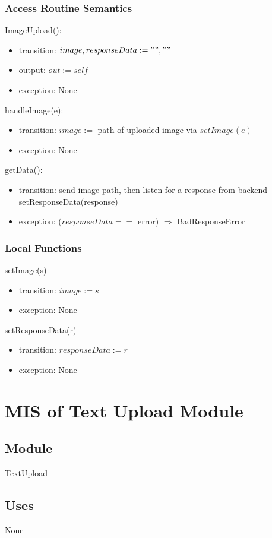 \documentclass[12pt, titlepage]{article}
\begin{document}
\subsubsection{Access Routine Semantics}
ImageUpload():
\begin{itemize}
	\item transition: $image, responseData := "", ""$
	\item output: $out := self$
	\item exception: None
\end{itemize}
\noindent
handleImage(e):
\begin{itemize}
	\item transition: $image :=$ path of uploaded image via $setImage(e)$
	\item exception: None
\end{itemize}
\noindent
getData():
\begin{itemize}
	\item transition: send image path, then listen for a response from 
	backend\\ setResponseData(response)
	\item exception: ($responseData ==$ error) $\Rightarrow$ BadResponseError
\end{itemize}
\subsubsection{Local Functions}
\noindent setImage(s)
\begin{itemize}
	\item transition: $ image :=s $
	\item exception: None
\end{itemize}
\noindent setResponseData(r)
\begin{itemize}
	\item transition: $ responseData:=r $
	\item exception: None
\end{itemize}

\newpage

\section{MIS of Text Upload Module} \label{TextUpload}
\subsection{Module}
TextUpload
\subsection{Uses}
None
\end{document}
